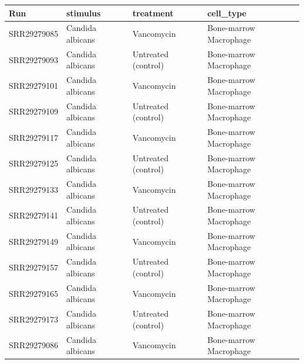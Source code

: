 \documentclass[
  letterpaper,
  DIV=11,
  numbers=noendperiod]{scrreprt}
\begin{document}
\begin{longtable}[]{@{}
  >{\raggedright\arraybackslash}p{}
  >{\raggedright\arraybackslash}p{}
  >{\raggedright\arraybackslash}p{}
  >{\raggedright\arraybackslash}p{}@{}}
\toprule\noalign{}
\begin{minipage}[b]{\linewidth}\raggedright
Run
\end{minipage} & \begin{minipage}[b]{\linewidth}\raggedright
stimulus
\end{minipage} & \begin{minipage}[b]{\linewidth}\raggedright
treatment
\end{minipage} & \begin{minipage}[b]{\linewidth}\raggedright
cell\_type
\end{minipage} \\
\midrule\noalign{}
\endhead
\bottomrule\noalign{}
\endlastfoot
SRR29279085 & Candida albicans & Vancomycin & Bone-marrow Macrophage \\
SRR29279093 & Candida albicans & Untreated (control) & Bone-marrow
Macrophage \\
SRR29279101 & Candida albicans & Vancomycin & Bone-marrow Macrophage \\
SRR29279109 & Candida albicans & Untreated (control) & Bone-marrow
Macrophage \\
SRR29279117 & Candida albicans & Vancomycin & Bone-marrow Macrophage \\
SRR29279125 & Candida albicans & Untreated (control) & Bone-marrow
Macrophage \\
SRR29279133 & Candida albicans & Vancomycin & Bone-marrow Macrophage \\
SRR29279141 & Candida albicans & Untreated (control) & Bone-marrow
Macrophage \\
SRR29279149 & Candida albicans & Vancomycin & Bone-marrow Macrophage \\
SRR29279157 & Candida albicans & Untreated (control) & Bone-marrow
Macrophage \\
SRR29279165 & Candida albicans & Vancomycin & Bone-marrow Macrophage \\
SRR29279173 & Candida albicans & Untreated (control) & Bone-marrow
Macrophage \\
SRR29279086 & Candida albicans & Vancomycin & Bone-marrow Macrophage \\

\end{longtable}
\end{document}
